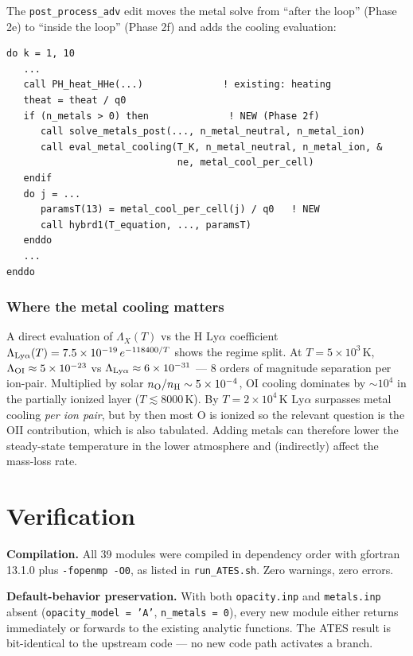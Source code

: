\documentclass[english,a4paper]{kiseon_memo}
\begin{document}
The \texttt{post\_process\_adv} edit moves the metal solve from
``after the loop'' (Phase 2e) to ``inside the loop'' (Phase 2f) and
adds the cooling evaluation:

\begin{verbatim}
do k = 1, 10
   ...
   call PH_heat_HHe(...)              ! existing: heating
   theat = theat / q0
   if (n_metals > 0) then              ! NEW (Phase 2f)
      call solve_metals_post(..., n_metal_neutral, n_metal_ion)
      call eval_metal_cooling(T_K, n_metal_neutral, n_metal_ion, &
                              ne, metal_cool_per_cell)
   endif
   do j = ...
      paramsT(13) = metal_cool_per_cell(j) / q0   ! NEW
      call hybrd1(T_equation, ..., paramsT)
   enddo
   ...
enddo
\end{verbatim}

\subsubsection*{Where the metal cooling matters}

A direct evaluation of $\Lambda_X(T)$ vs the H Ly$\alpha$ coefficient
$\Lambda_{\rm Ly\alpha}(T) = 7.5\times 10^{-19}\,e^{-118400/T}$
shows the regime split. At $T = 5\times 10^3\,$K,
$\Lambda_{\rm OI} \approx 5\times 10^{-23}$ vs
$\Lambda_{\rm Ly\alpha} \approx 6\times 10^{-31}$ ---
$8$ orders of magnitude separation per ion-pair. Multiplied by solar
$n_{\rm O}/n_{\rm H} \sim 5 \times 10^{-4}$, OI cooling dominates by
$\sim 10^4$ in the partially ionized layer ($T \lesssim 8000\,$K).
By $T = 2 \times 10^4\,$K Ly$\alpha$ surpasses metal cooling
\emph{per ion pair}, but by then most O is ionized so the relevant
question is the OII contribution, which is also tabulated. Adding
metals can therefore lower the steady-state temperature in the lower
atmosphere and (indirectly) affect the mass-loss rate.

\section{Verification}

\textbf{Compilation.} All 39 modules were compiled in dependency order
with gfortran 13.1.0 plus \texttt{-fopenmp -O0}, as listed in
\texttt{run\_ATES.sh}. Zero warnings, zero errors.

\textbf{Default-behavior preservation.} With both \texttt{opacity.inp} and
\texttt{metals.inp} absent (\texttt{opacity\_model = 'A'},
\texttt{n\_metals = 0}), every new module either returns immediately or
forwards to the existing analytic functions. The ATES result is
bit-identical to the upstream code --- no new code path activates a branch.
\end{document}
